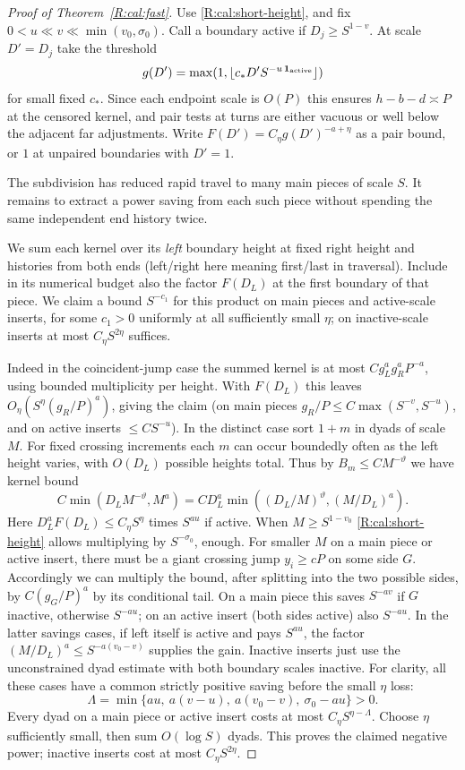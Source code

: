 \begin{proof}[Proof of Theorem~\ref{R:cal:fast}]
Use \eqref{R:cal:short-height}, and fix \(0<u\ll v\ll \min(v_0,\sigma_0)\). Call a boundary active if \(D_j\ge S^{1-v}\). At scale \(D'=D_j\) take the threshold
\[
 g(D')=\max(1,\lfloor c_*D'S^{-u\,{\bf1}_{\rm active}}\rfloor)
\]
for small fixed \(c_*\). Since each endpoint scale is \(O(P)\) this ensures \(h-b-d\asymp P\) at the censored kernel, and pair tests at turns are either vacuous or well below the adjacent far adjustments. Write \(F(D')=C_\eta g(D')^{-a+\eta}\) as a pair bound, or \(1\) at unpaired boundaries with \(D'=1\).

The subdivision has reduced rapid travel to many main pieces of scale $S$.
It remains to extract a power saving from each such piece without spending
the same independent end history twice.

We sum each kernel over its \emph{left} boundary height at fixed right height and histories from both ends (left/right here meaning first/last in traversal). Include in its numerical budget also the factor \(F(D_L)\) at the first boundary of that piece. We claim a bound \(S^{-c_1}\) for this product on main pieces and active-scale inserts, for some \(c_1>0\) uniformly at all sufficiently small \(\eta\); on inactive-scale inserts at most \(C_\eta S^{2\eta}\) suffices.

Indeed in the coincident-jump case the summed kernel is at most \(C g_L^a g_R^a P^{-a}\), using bounded multiplicity per height. With \(F(D_L)\) this leaves \(O_\eta(S^\eta (g_R/P)^a)\), giving the claim (on main pieces \(g_R/P\le C\max(S^{-v},S^{-u})\), and on active inserts \(\le CS^{-u}\)). In the distinct case sort \(1+m\) in dyads of scale \(M\). For fixed crossing increments each \(m\) can occur boundedly often as the left height varies, with \(O(D_L)\) possible heights total. Thus by \(B_m\le C M^{-\vartheta}\) we have kernel bound
\[
 C\min(D_L M^{-\vartheta},M^a)
   = C D_L^a\min((D_L/M)^\vartheta,(M/D_L)^a).
\]
Here \(D_L^a F(D_L)\le C_\eta S^\eta\) times \(S^{a u}\) if active. When \(M\ge S^{1-v_0}\) \eqref{R:cal:short-height} allows multiplying by \(S^{-\sigma_0}\), enough. For smaller \(M\) on a main piece or active insert, there must be a giant crossing jump \(y_i\ge cP\) on some side \(G\). Accordingly we can multiply the bound, after splitting into the two possible sides, by \(C (g_G/P)^a\) by its conditional tail. On a main piece this saves \(S^{-av}\) if \(G\) inactive, otherwise \(S^{-au}\); on an active insert (both sides active) also \(S^{-au}\). In the latter savings cases, if left itself is active and pays \(S^{au}\), the factor \((M/D_L)^a\le S^{-a(v_0-v)}\) supplies the gain. Inactive inserts just use the unconstrained dyad estimate with both boundary scales inactive. For clarity, all these cases have a common strictly positive saving before
the small $\eta$ loss:
\[
 \Lambda=\min\{au,\ a(v-u),\ a(v_0-v),\ \sigma_0-au\}>0.
\]
Every dyad on a main piece or active insert costs at most
$C_\eta S^{\eta-\Lambda}$. Choose $\eta$ sufficiently small, then sum
$O(\log S)$ dyads. This proves the claimed negative power; inactive inserts
cost at most $C_\eta S^{2\eta}$.


\end{proof}
